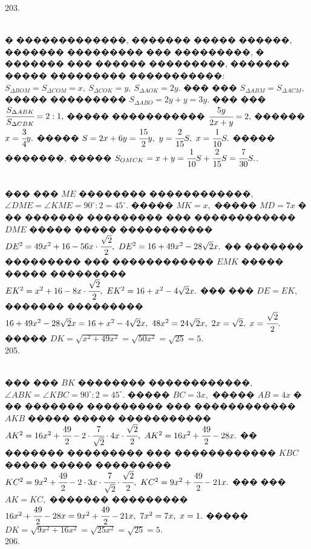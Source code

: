 \documentclass[12pt]{article}
\begin{document}
203. \begin{figure}[ht!]
\end{figure}\\
� �������������, ������� ����� ������, ������� ��������� ��� ���������, � ������� ��� ������ ���������, ������� ����� ��������� �����������: $S_{\Delta BOM}=S_{\Delta COM}=x,\ S_{\Delta COK}=y,\ S_{\Delta AOK}=2y.$ ��� ��� $S_{\Delta ABM}=S_{\Delta ACM},$ ����� ��������� $S_{\Delta ABO}=2y+y=3y.$
��� ��� $\cfrac{S_{\Delta ABK}}{S_{\Delta CBK}}=2:1,$ ����� �����������
$\cfrac{5y}{2x+y}=2,$ ������ $x=\cfrac{3}{4}y.$ ����� $S=2x+6y=\cfrac{15}{2}y,\ y=\cfrac{2}{15}S,\ x=\cfrac{1}{10}S.$ ����� �������, �����
$S_{OMCK}=x+y=\cfrac{1}{10}S+\cfrac{2}{15}S=\cfrac{7}{30}S.$\newpage{}. \begin{figure}[ht!]
\end{figure}\\
��� ��� $ME$ �������� ������������, $\angle DME=\angle KME=90^\circ:2=45^\circ.$ ����� $MK=x,$ ����� $MD=7x$ � �� ������� ��������� ��� ������������ $DME$ ����� ����� ����������� $DE^2=49x^2+16-56x\cdot \cfrac{\sqrt{2}}{2},\ DE^2=16+49x^2-28\sqrt{2}x.$ �� ������� ��������� ��� ������������ $EMK$ ����� ����� ��������� $EK^2=x^2+16-8x\cdot \cfrac{\sqrt{2}}{2},\ EK^2=16+x^2-4\sqrt{2}x.$ ��� ��� $DE=EK,$ ������� ��������� $16+49x^2-28\sqrt{2}x=16+x^2-4\sqrt{2}x,\ 48x^2=24\sqrt{2}x,\ 2x=\sqrt{2},\ x=\cfrac{\sqrt{2}}{2}.$ ����� $DK=\sqrt{x^2+49x^2}=\sqrt{50x^2}=\sqrt{25}=5.$\\
205. \begin{figure}[ht!]
\end{figure}\\
��� ��� $BK$ �������� ������������, $\angle ABK=\angle KBC=90^\circ:2=45^\circ.$ ����� $BC=3x,$ ����� $AB=4x$ � �� ������� ��������� ��� ������������ $AKB$ ����� ����� ����������� $AK^2=16x^2+\cfrac{49}{2}-2\cdot\cfrac{7}{\sqrt{2}}\cdot 4x\cdot \cfrac{\sqrt{2}}{2},\ AK^2=16x^2+\cfrac{49}{2}-28x.$ �� ������� ��������� ��� ������������ $KBC$ ����� ����� ��������� $KC^2=9x^2+\cfrac{49}{2}-2\cdot 3x\cdot\cfrac{7}{\sqrt{2}}\cdot \cfrac{\sqrt{2}}{2},\ KC^2=9x^2+\cfrac{49}{2}-21x.$ ��� ��� $AK=KC,$ ������� ��������� $16x^2+\cfrac{49}{2}-28x=9x^2+\cfrac{49}{2}-21x,\ 7x^2=7x,\ x=1.$ ����� $DK=\sqrt{9x^2+16x^2}=\sqrt{25x^2}=\sqrt{25}=5.$\\
206. \begin{figure}[ht!]
\end{figure}\\
\end{document}
